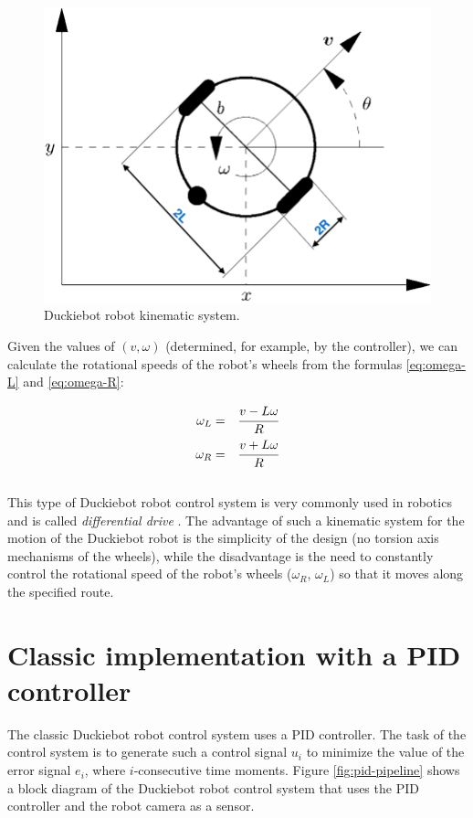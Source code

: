 \documentclass[conference]{IEEEtran}
\begin{document}
\begin{figure}[h]
    \centering
    \includegraphics[width=.8\columnwidth]{dt-kinematic}
    \caption{Duckiebot robot kinematic system.}
    \label{fig:duckiebot-kinematics}
\end{figure}

Given the values of $(v, \omega)$ (determined, for example, by the controller), we can calculate the rotational speeds of the robot's wheels from the formulas \eqref{eq:omega-L} and \eqref{eq:omega-R}:

\begin{eqnarray}
	\omega_L & = & \cfrac{v-L\omega}{R} \label{eq:omega-L} \\
	\omega_R & = & \cfrac{v+L\omega}{R} \label{eq:omega-R}
\end{eqnarray}
\\
This type of Duckiebot robot control system is very commonly used in robotics and is called \emph{differential drive} \cite{siegwart2011introduction}. The advantage of such a kinematic system for the motion of the Duckiebot robot is the simplicity of the design (no torsion axis mechanisms of the wheels), while the disadvantage is the need to constantly control the rotational speed of the robot's wheels ($\omega_R$, $\omega_L$) so that it moves along the specified route.


\section{Classic implementation with a PID controller}\label{sec:pid-controller}
The classic Duckiebot robot control system uses a PID controller. The task of the control system is to generate such a control signal $u_i$ to minimize the value of the error signal $e_i$, where $i$-consecutive time moments. Figure \ref{fig:pid-pipeline} shows a block diagram of the Duckiebot robot control system that uses the PID controller and the robot camera as a sensor.
\end{document}
